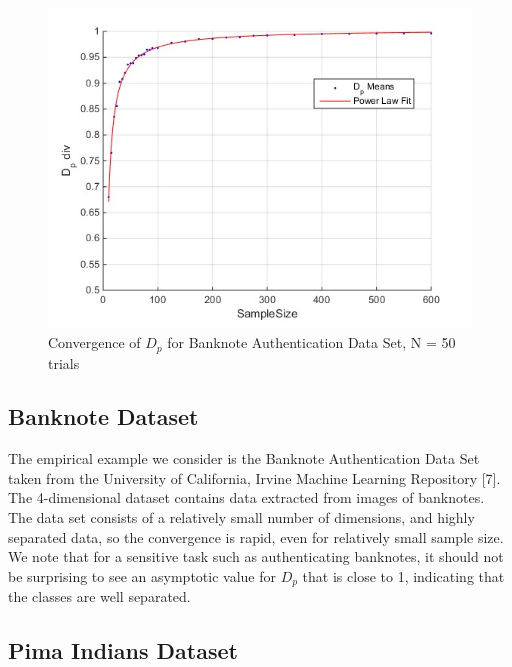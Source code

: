 \documentclass{article}
\begin{document}
	
	\newpage
	\begin{figure}[h!]
		\caption{Convergence of $D_p$ for Banknote Authentication Data Set, N = 50 trials}
		\centering
		\includegraphics[scale=0.6]{dp_n50_banknote}
	\end{figure}
	
	\newpage
	\subsection{\small Banknote Dataset}
	\indent The empirical example we consider is the Banknote Authentication Data Set taken from the University of California, Irvine Machine Learning Repository [7]. The 4-dimensional dataset contains data extracted from images of banknotes. The data set consists of a relatively small number of dimensions, and highly separated data, so the convergence is rapid, even for relatively small sample size. We note that for a sensitive task such as authenticating banknotes, it should not be surprising to see an asymptotic value for $D_p$ that is close to 1, indicating that the classes are well separated.  
	
	\newpage
	\subsection{\small Pima Indians Dataset}
	
\end{document}
